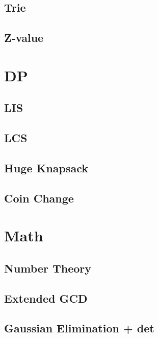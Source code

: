     \subsection{Trie}
        
    \subsection{Z-value}
        

\section{DP}
    \subsection{LIS}
        
    \subsection{LCS}
        
    \subsection{Huge Knapsack}
        
    \subsection{Coin Change}
        

\section{Math}
    \subsection{Number Theory}
        
    \subsection{Extended GCD}
        
    \subsection{Gaussian Elimination + det}
        
